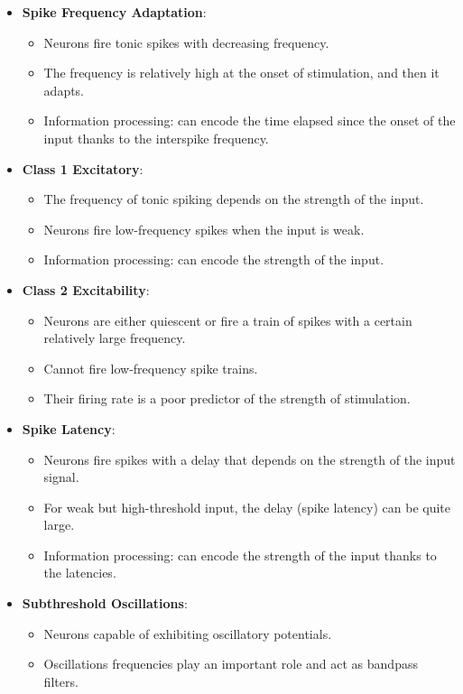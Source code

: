 \documentclass{article} %
\begin{document}
\begin{itemize}
    \item \textbf{Spike Frequency Adaptation}:
    \begin{itemize}
        \item Neurons fire tonic spikes with decreasing frequency.
        \item The frequency is relatively high at the onset of stimulation, and then it adapts.
        \item Information processing: can encode the time elapsed since the onset of the input thanks to the interspike frequency.
    \end{itemize}
    
    \item \textbf{Class 1 Excitatory}:
    \begin{itemize}
        \item The frequency of tonic spiking depends on the strength of the input.
        \item Neurons fire low-frequency spikes when the input is weak.
        \item Information processing: can encode the strength of the input.
    \end{itemize}
    
    \item \textbf{Class 2 Excitability}:
    \begin{itemize}
        \item Neurons are either quiescent or fire a train of spikes with a certain relatively large frequency.
        \item Cannot fire low-frequency spike trains.
        \item Their firing rate is a poor predictor of the strength of stimulation.
    \end{itemize}
    
    \item \textbf{Spike Latency}:
    \begin{itemize}
        \item Neurons fire spikes with a delay that depends on the strength of the input signal.
        \item For weak but high-threshold input, the delay (spike latency) can be quite large.
        \item Information processing: can encode the strength of the input thanks to the latencies.
    \end{itemize}
    
    \item \textbf{Subthreshold Oscillations}:
    \begin{itemize}
        \item Neurons capable of exhibiting oscillatory potentials.
        \item Oscillations frequencies play an important role and act as bandpass filters.
    \end{itemize}
    

\end{itemize}
\end{document}
